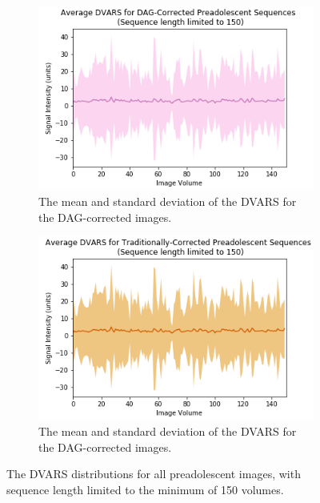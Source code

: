 \begin{figure}[ht]
	\begin{subfigure}{0.45\textwidth}
		\centering
		\includegraphics[width=1\textwidth]{6/figures/pread-dag-dvars-150.png}
		\caption{The mean and standard deviation of the DVARS for the DAG-corrected images.}
	\end{subfigure}%
	\vspace{0.05\textwidth}
	\begin{subfigure}{0.45\textwidth}
		\centering
		\includegraphics[width=1\textwidth]{6/figures/pread-trad-dvars-150.png}
		\caption{The mean and standard deviation of the DVARS for the DAG-corrected images.}
	\end{subfigure}
\caption{The DVARS distributions for all preadolescent images, with sequence length limited to the minimum of 150 volumes.}
\label{fig:pread-dvars-150}
\end{figure}


